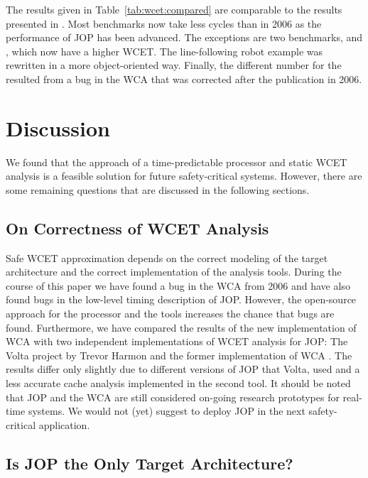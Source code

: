 
The results given in Table~\ref{tab:wcet:compared} are comparable to
the results presented in \cite{jop:wcet:jtres06}. Most benchmarks now
take less cycles than in 2006 as the performance of JOP has been
advanced. The exceptions are two benchmarks,  and
, which now have a higher WCET. The line-following robot
example was rewritten in a more object-oriented way. Finally, the
different number for the  resulted from a bug in the WCA
that was corrected after the publication in 2006.

\section{Discussion}
\label{sec:wcet:discussion}

We found that the approach of a time-predictable processor and static
WCET analysis is a feasible solution for future safety-critical
systems. However, there are some remaining questions that are
discussed in the following sections.

\subsection{On Correctness of WCET Analysis}

Safe WCET approximation depends on the correct modeling of the target
architecture and the correct implementation of the analysis tools.
During the course of this paper we have found a bug in the WCA from
2006 and have also found bugs in the low-level timing description of
JOP. However, the open-source approach for the processor and the
tools increases the chance that bugs are found. Furthermore, we have
compared the results of the new implementation of WCA with two
independent implementations of WCET analysis for JOP: The Volta
project by Trevor Harmon \cite{Trevor:Volta} and the former
implementation of WCA \cite{jop:wcet:jtres06}. The results differ
only slightly due to different versions of JOP that Volta, used and a
less accurate cache analysis implemented in the second tool. It
should be noted that JOP and the WCA are still considered on-going
research prototypes for real-time systems. We would not (yet) suggest
to deploy JOP in the next safety-critical application.

\subsection{Is JOP the Only Target Architecture?}

